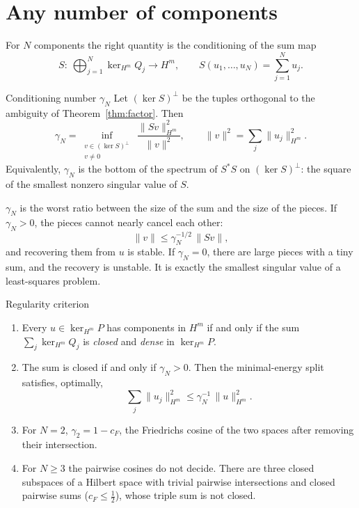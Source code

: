\section{Any number of components}

For $N$ components the right quantity is the conditioning of the sum map
\[
S:\ \bigoplus_{j=1}^N\ker_{H^m}Q_j\to H^m,\qquad S(u_1,\dots,u_N)=\sum_{j=1}^Nu_j .
\]

\begin{definition}{Conditioning number $\gamma_N$}\label{def:gamma}
Let $(\ker S)^\perp$ be the tuples orthogonal to the ambiguity of Theorem~\ref{thm:factor}. Then
\[
\gamma_N=\inf_{\substack{v\in(\ker S)^\perp\\ v\ne0}}\ \frac{\|Sv\|_{H^m}^2}{\|v\|^2},
\qquad \|v\|^2=\sum_j\|u_j\|_{H^m}^2 .
\]
Equivalently, $\gamma_N$ is the bottom of the spectrum of $S^*S$ on $(\ker S)^\perp$: the square of the smallest nonzero singular value of $S$.
\end{definition}

\begin{intuition}
$\gamma_N$ is the worst ratio between the size of the sum and the size of the pieces. If $\gamma_N>0$, the pieces cannot nearly cancel each other:
\[
\|v\|\le\gamma_N^{-1/2}\,\|Sv\| ,
\]
and recovering them from $u$ is stable. If $\gamma_N=0$, there are large pieces with a tiny sum, and the recovery is unstable. It is exactly the smallest singular value of a least-squares problem.
\end{intuition}

\begin{theorem}{Regularity criterion  \proved}\label{thm:hm}
\begin{enumerate}[label=(\alph*)]
\item Every $u\in\ker_{H^m}P$ has components in $H^m$ if and only if the sum $\sum_j\ker_{H^m}Q_j$ is \emph{closed} and \emph{dense} in $\ker_{H^m}P$.
\item The sum is closed if and only if $\gamma_N>0$. Then the minimal-energy split satisfies, optimally,
\[
\sum_j\|u_j\|_{H^m}^2\le\gamma_N^{-1}\,\|u\|_{H^m}^2 .
\]
\item For $N=2$, $\gamma_2=1-c_F$, the Friedrichs cosine of the two spaces after removing their intersection.
\item For $N\ge3$ the pairwise cosines do not decide. There are three closed subspaces of a Hilbert space with trivial pairwise intersections and closed pairwise sums ($c_F\le\tfrac12$), whose triple sum is not closed.
\end{enumerate}
\end{theorem}

